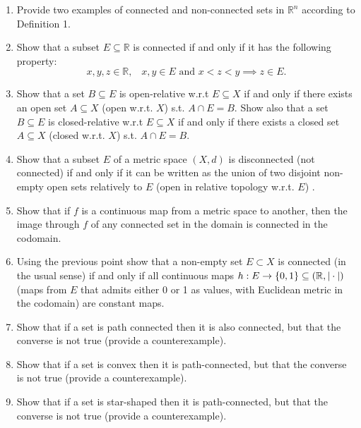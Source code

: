 \documentclass[12pt,a4paper]{article}
\newcommand{\Tailperso}[1]{%
\vfill	
\vskip2ex\noindent
\hrule
\vskip2ex\noindent
{\small
Informations générales, séries, voir \url{https://moodle.unige.ch/course/view.php?id=5641}}
\vskip2ex\noindent
\vskip2ex
}
\begin{document}
\begin{enumerate}
	\item Provide two examples of connected and non-connected sets in $\mathbb R^n$ according to Definition 1.
	\item Show that a subset $E\subseteq \mathbb R$ is connected if and only if it has the following property:
	\[x,y,z\in \mathbb R,\;\;\; x,y\in E \text{ and } x<z<y \implies z\in E.\]
	\item Show that a set $B\subseteq E$ is open-relative w.r.t $E\subseteq X$ if and only if there exists an open set $A\subseteq X$ (open w.r.t. $X$) s.t. $A\cap E = B$. Show also that a set $B\subseteq E$ is closed-relative w.r.t $E\subseteq X$ if and only if there exists a closed set $A\subseteq X$ (closed w.r.t. $X$) s.t. $A\cap E = B$.
	\item Show that a subset $E$ of a metric space $(X,d)$ is disconnected (not connected) if and only if it can be written as the union of two disjoint non-empty open sets relatively to $E$ (open in relative topology w.r.t. $E$) .
	\item Show that if $f$ is a continuous map from a metric space to another, then the image through $f$ of any connected set in the domain is connected in the codomain.
	\item Using the previous point show that a non-empty set $E\subset X$ is connected (in the usual sense) if and only if all continuous maps $h:E\to \{0,1\}\subseteq (\mathbb{R},|\cdot|)$ (maps from $E$ that admits either 0 or 1 as values, with Euclidean metric in the codomain) are constant maps.
	\item Show that if a set is path connected then it is also connected, but that the converse is not true (provide a counterexample).
	\item Show that if a set is convex then it is path-connected, but that the converse is not true (provide a counterexample).
	\item Show that if a set is star-shaped then it is path-connected, but that the converse is not true (provide a counterexample).
\end{enumerate}
\bigskip






 
\end{document}
